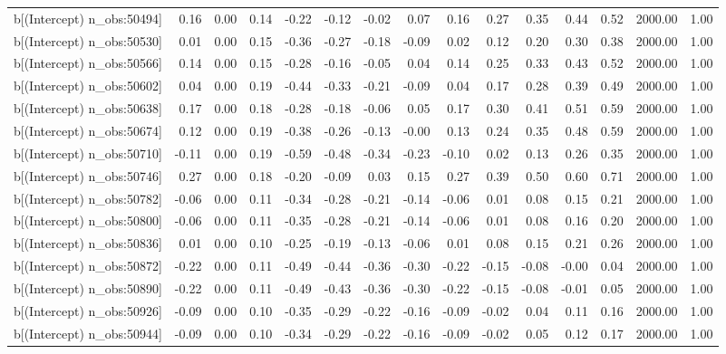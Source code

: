\begin{table}[ht]
\begin{tabular}{rrrrrrrrrrrrrrr}
  b[(Intercept) n\_obs:50494] & 0.16 & 0.00 & 0.14 & -0.22 & -0.12 & -0.02 & 0.07 & 0.16 & 0.27 & 0.35 & 0.44 & 0.52 & 2000.00 & 1.00 \\ 
  b[(Intercept) n\_obs:50530] & 0.01 & 0.00 & 0.15 & -0.36 & -0.27 & -0.18 & -0.09 & 0.02 & 0.12 & 0.20 & 0.30 & 0.38 & 2000.00 & 1.00 \\ 
  b[(Intercept) n\_obs:50566] & 0.14 & 0.00 & 0.15 & -0.28 & -0.16 & -0.05 & 0.04 & 0.14 & 0.25 & 0.33 & 0.43 & 0.52 & 2000.00 & 1.00 \\ 
  b[(Intercept) n\_obs:50602] & 0.04 & 0.00 & 0.19 & -0.44 & -0.33 & -0.21 & -0.09 & 0.04 & 0.17 & 0.28 & 0.39 & 0.49 & 2000.00 & 1.00 \\ 
  b[(Intercept) n\_obs:50638] & 0.17 & 0.00 & 0.18 & -0.28 & -0.18 & -0.06 & 0.05 & 0.17 & 0.30 & 0.41 & 0.51 & 0.59 & 2000.00 & 1.00 \\ 
  b[(Intercept) n\_obs:50674] & 0.12 & 0.00 & 0.19 & -0.38 & -0.26 & -0.13 & -0.00 & 0.13 & 0.24 & 0.35 & 0.48 & 0.59 & 2000.00 & 1.00 \\ 
  b[(Intercept) n\_obs:50710] & -0.11 & 0.00 & 0.19 & -0.59 & -0.48 & -0.34 & -0.23 & -0.10 & 0.02 & 0.13 & 0.26 & 0.35 & 2000.00 & 1.00 \\ 
  b[(Intercept) n\_obs:50746] & 0.27 & 0.00 & 0.18 & -0.20 & -0.09 & 0.03 & 0.15 & 0.27 & 0.39 & 0.50 & 0.60 & 0.71 & 2000.00 & 1.00 \\ 
  b[(Intercept) n\_obs:50782] & -0.06 & 0.00 & 0.11 & -0.34 & -0.28 & -0.21 & -0.14 & -0.06 & 0.01 & 0.08 & 0.15 & 0.21 & 2000.00 & 1.00 \\ 
  b[(Intercept) n\_obs:50800] & -0.06 & 0.00 & 0.11 & -0.35 & -0.28 & -0.21 & -0.14 & -0.06 & 0.01 & 0.08 & 0.16 & 0.20 & 2000.00 & 1.00 \\ 
  b[(Intercept) n\_obs:50836] & 0.01 & 0.00 & 0.10 & -0.25 & -0.19 & -0.13 & -0.06 & 0.01 & 0.08 & 0.15 & 0.21 & 0.26 & 2000.00 & 1.00 \\ 
  b[(Intercept) n\_obs:50872] & -0.22 & 0.00 & 0.11 & -0.49 & -0.44 & -0.36 & -0.30 & -0.22 & -0.15 & -0.08 & -0.00 & 0.04 & 2000.00 & 1.00 \\ 
  b[(Intercept) n\_obs:50890] & -0.22 & 0.00 & 0.11 & -0.49 & -0.43 & -0.36 & -0.30 & -0.22 & -0.15 & -0.08 & -0.01 & 0.05 & 2000.00 & 1.00 \\ 
  b[(Intercept) n\_obs:50926] & -0.09 & 0.00 & 0.10 & -0.35 & -0.29 & -0.22 & -0.16 & -0.09 & -0.02 & 0.04 & 0.11 & 0.16 & 2000.00 & 1.00 \\ 
  b[(Intercept) n\_obs:50944] & -0.09 & 0.00 & 0.10 & -0.34 & -0.29 & -0.22 & -0.16 & -0.09 & -0.02 & 0.05 & 0.12 & 0.17 & 2000.00 & 1.00 \\ 

\end{tabular}
\end{table}
